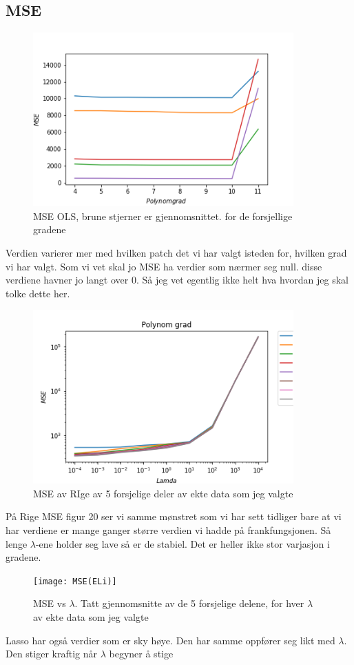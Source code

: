 \documentclass[norsk,a4paper,12pt]{article}
\begin{document}
\subsection*{MSE}
\begin{figure}[H]
\includegraphics[width=100mm]{MSEE_OLS}
\caption{MSE OLS, brune stjerner er gjennomsnittet. for de forsjellige gradene }
\end{figure}
Verdien varierer mer med hvilken patch det vi har valgt isteden for, hvilken grad vi har valgt. Som vi vet skal jo MSE ha verdier som nærmer seg null. disse verdiene havner jo langt over 0. Så jeg vet egentlig ikke helt hva hvordan jeg skal tolke dette her.

\begin{figure}[H]
\includegraphics[width=100mm]{MSE(ERi)}
\caption{MSE av RIge av 5 forsjelige deler av ekte data som jeg valgte  }
\end{figure}
På Rige MSE figur 20  ser vi samme mønstret som vi har sett tidliger bare at vi har verdiene er mange ganger større verdien vi hadde på frankfungsjonen. Så lenge $\lambda$-ene holder seg lave så er de stabiel. Det er heller ikke stor varjasjon i gradene.
\begin{figure}[H]
\texttt{[image: MSE(ELi)]}
\caption{MSE vs $\lambda$. Tatt gjennomsnitte av de 5 forsjelige delene, for hver $\lambda$ av ekte data som jeg valgte  }
\end{figure}
Lasso har også verdier som er sky høye. Den har samme oppfører seg likt med $\lambda$. Den stiger kraftig når $\lambda$ begyner å stige 
\end{document}
